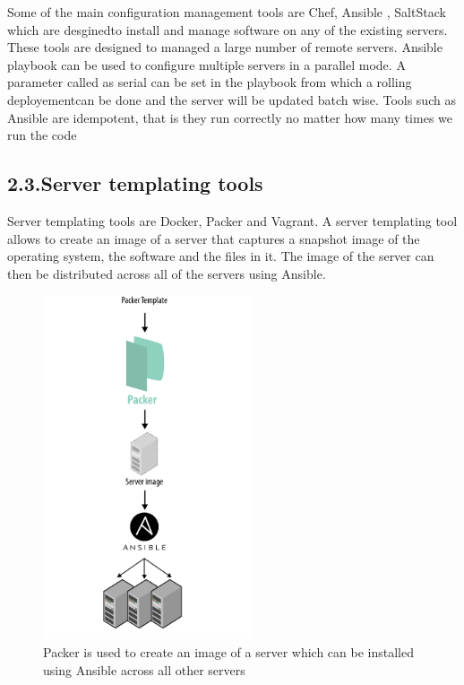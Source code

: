 \documentclass[9pt,twocolumn,twoside]{../../styles/osajnl}
\begin{document}
Some of the main configuration management tools are Chef, Ansible ,
SaltStack which are desgined\SE to install and manage software on any of
the existing servers. These tools are designed to managed a large
number of remote servers. Ansible playbook can be used to configure
multiple servers in a parallel mode. A parameter called as serial can
be set in the playbook from which a rolling deployement\SE can be done
and the server will be updated batch wise. Tools such as Ansible are
idempotent, that is they run correctly no matter how many times we run
the code\cite{www-terraform-upandrunning}

\subsection{2.3.Server templating tools}
Server templating \SE tools are Docker, Packer and Vagrant. A server
templating tool allows to create an image of a server that captures a
snapshot image of the operating system, the software and the files in
it. The image of the server can then be distributed across all of the
servers using Ansible\cite{www-terraform-upandrunning}.


\begin{figure}[h]
  \begin{center}
 \includegraphics[width=\linewidth,height=4in]{images/packer}
 \caption{ Packer is used to create an image of a server which can be installed using Ansible across all other servers \cite{www-terraform-upandrunning}}
 \label{fig}
  \end{center}
\end{figure}
\end{document}
